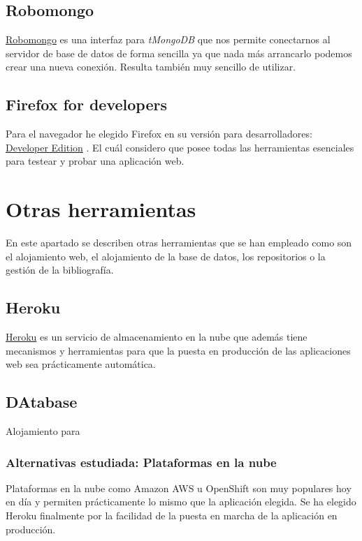 \subsection{Robomongo}\label{entorno-desarrollo}
\hyperlink{http://http//robomongo.org/}{Robomongo} es una interfaz para \emph{tMongoDB} que nos permite conectarnos al servidor de base de datos de forma sencilla ya que nada más arrancarlo podemos crear una nueva conexión. Resulta también muy sencillo de utilizar.


\subsection{Firefox for developers}\label{firefox}
Para el navegador he elegido Firefox en su versión para desarrolladores: \hyperlink{https://www.mozilla.org/es-ES/firefox/developer}{Developer Edition} . El cuál considero que posee todas las herramientas esenciales para testear y probar una aplicación web.




\section{Otras herramientas}\label{herramientas}
En este apartado se describen otras herramientas que se han empleado como son el alojamiento web, el alojamiento de la base de datos, los repositorios o la gestión de la bibliografía.

 \subsection{Heroku}\label{heroku}
\hyperlink{https://www.heroku.com/}{Heroku}  es un servicio de almacenamiento en la nube que además tiene mecanismos y herramientas para que la puesta en producción de las aplicaciones web sea prácticamente automática.

 \subsection{DAtabase}\label{heroku}
 Alojamiento para 

  \subsubsection{Alternativas estudiada: Plataformas en la nube}\label{tnube}
  Plataformas en la nube como Amazon AWS u OpenShift son muy populares hoy en día y permiten prácticamente lo mismo que la aplicación elegida. Se ha elegido Heroku finalmente por la facilidad de la puesta en marcha de la aplicación en producción.
  
